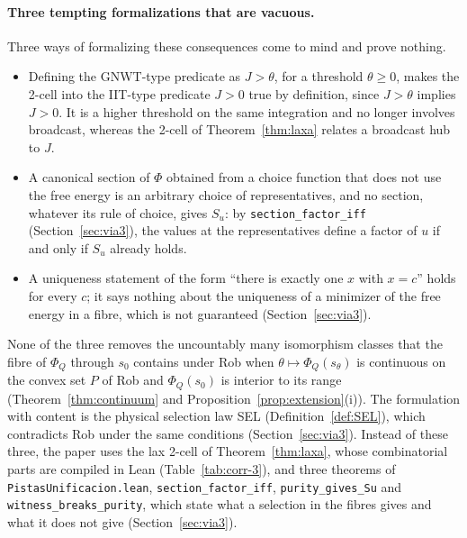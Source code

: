 \paragraph{Three tempting formalizations that are vacuous.} Three ways of formalizing these consequences come to mind and prove nothing.
\begin{itemize}
\item Defining the GNWT-type predicate as $J>\theta$, for a threshold $\theta\ge0$, makes the 2-cell into the IIT-type predicate $J>0$ true by definition, since $J>\theta$ implies $J>0$. It is a higher threshold on the same integration and no longer involves broadcast, whereas the 2-cell of Theorem~\ref{thm:laxa} relates a broadcast hub to $J$.
\item A canonical section of $\Phi$ obtained from a choice function that does not use the free energy is an arbitrary choice of representatives, and no section, whatever its rule of choice, gives $S_u$: by \texttt{section\_factor\_iff} (Section~\ref{sec:via3}), the values at the representatives define a factor of $u$ if and only if $S_u$ already holds.
\item A uniqueness statement of the form ``there is exactly one $x$ with $x=c$'' holds for every $c$; it says nothing about the uniqueness of a minimizer of the free energy in a fibre, which is not guaranteed (Section~\ref{sec:via3}).
\end{itemize}
None of the three removes the uncountably many isomorphism classes that the fibre of $\Phi_Q$ through $s_0$ contains under Rob when $\theta\mapsto\Phi_Q(s_\theta)$ is continuous on the convex set $P$ of Rob and $\Phi_Q(s_0)$ is interior to its range (Theorem~\ref{thm:continuum} and Proposition~\ref{prop:extension}(i)). The formulation with content is the physical selection law SEL (Definition~\ref{def:SEL}), which contradicts Rob under the same conditions (Section~\ref{sec:via3}). Instead of these three, the paper uses the lax 2-cell of Theorem~\ref{thm:laxa}, whose combinatorial parts are compiled in Lean (Table~\ref{tab:corr-3}), and three theorems of \texttt{PistasUnificacion.lean}, \texttt{section\_factor\_iff}, \texttt{purity\_gives\_Su} and \texttt{witness\_breaks\_purity}, which state what a selection in the fibres gives and what it does not give (Section~\ref{sec:via3}).
\clearpage
